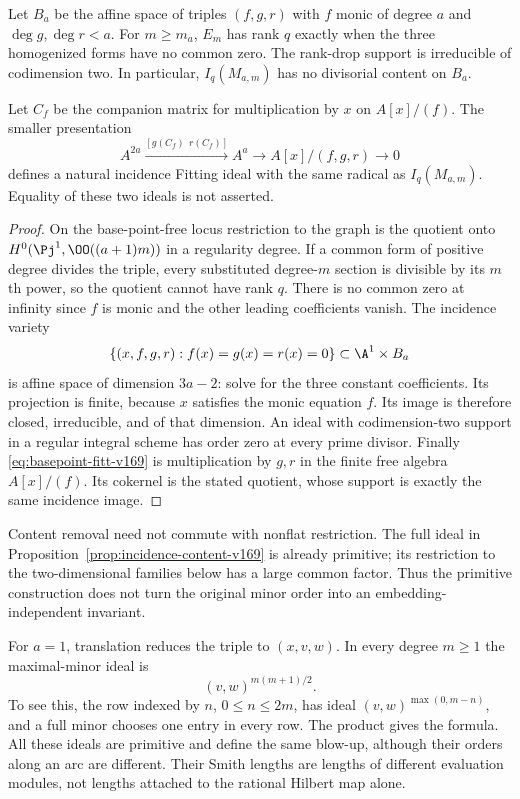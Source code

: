 \begin{proposition}
\label{prop:incidence-content-v169}
Let $B_a$ be the affine space of triples $(f,g,r)$ with $f$ monic of
degree $a$ and $\deg g,\deg r<a$. For $m\geq m_a$, $E_m$ has rank $q$
exactly when the three homogenized forms have no common zero. The
rank-drop support is irreducible of codimension two. In particular,
$I_q(M_{a,m})$ has no divisorial content on $B_a$.

Let $C_f$ be the companion matrix for multiplication by $x$ on
$A[x]/(f)$. The smaller presentation
\begin{equation}\label{eq:basepoint-fitt-v169}
 A^{2a}\xrightarrow{[g(C_f)\ \ r(C_f)]}A^a
       \longrightarrow A[x]/(f,g,r)\longrightarrow0
\end{equation}
defines a natural incidence Fitting ideal with the same radical as
$I_q(M_{a,m})$. Equality of these two ideals is not asserted.
\end{proposition}
\begin{proof}
On the base-point-free locus restriction to the graph is the quotient
onto $H^0(\Pj^1,\OO((a+1)m))$ in a regularity degree. If a common form
of positive degree divides the triple, every substituted degree-$m$
section is divisible by its $m$th power, so the quotient cannot have
rank $q$. There is no common zero at infinity since $f$ is monic and
the other leading coefficients vanish. The incidence variety
\[
 \{(x,f,g,r):f(x)=g(x)=r(x)=0\}\subset\A^1\times B_a
\]
is affine space of dimension $3a-2$: solve for the three constant
coefficients. Its projection is finite, because $x$ satisfies the
monic equation $f$. Its image is therefore closed, irreducible, and
of that dimension. An ideal with codimension-two support in a regular
integral scheme has order zero at every prime divisor. Finally
\eqref{eq:basepoint-fitt-v169} is multiplication by $g,r$ in the finite
free algebra $A[x]/(f)$. Its cokernel is the stated quotient, whose
support is exactly the same incidence image.
\end{proof}
Content removal need not commute with nonflat restriction. The full
ideal in Proposition~\ref{prop:incidence-content-v169} is already
primitive; its restriction to the two-dimensional families below
has a large common factor. Thus the primitive construction does not
turn the original minor order into an embedding-independent invariant.

\begin{example}\label{ex:degree-content-v169}
For $a=1$, translation reduces the triple to $(x,v,w)$. In every degree
$m\geq1$ the maximal-minor ideal is
\[
 (v,w)^{m(m+1)/2}.
\]
To see this, the row indexed by $n$, $0\leq n\leq2m$, has ideal
$(v,w)^{\max(0,m-n)}$, and a full minor chooses one entry in every
row. The product gives the formula. All these ideals are primitive
and define the same blow-up, although their orders along an arc are
different. Their Smith lengths are lengths of different evaluation
modules, not lengths attached to the rational Hilbert map alone.
\end{example}

